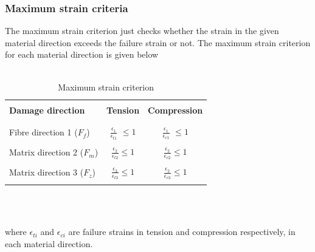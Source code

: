 \documentclass[a4paper,12pt]{article}
\begin{document}
\subsubsection{Maximum strain criteria}
\indent\indent\indent The maximum strain criterion just checks whether the strain in the given material direction exceeds the failure strain or not. The maximum strain criterion for each material direction is given below
\\
\\
\begin{table}[h!]
  \begin{center}
     \begin{tabular}{l  c  c} 
     \hline
     \\
      \textbf{Damage direction} \;\;& \textbf{Tension} \;& \textbf{Compression}\\
      \\
      \hline
      \\
      Fibre direction 1 ($F_{f}$) & \Large{$\frac{\epsilon_{1}}{\epsilon_{t1}} $}\small{ $\leq 1$} &  \Large{$\frac{\epsilon_{1}}{\epsilon_{c1}} $}\small{ $\leq 1$}\\
      \\
      Matrix direction 2 ($F_{m}$)  &  \Large{$\frac{\epsilon_{2}}{\epsilon_{t2}} $}\small{$\leq 1$}  & \Large{$\frac{\epsilon_{2}}{\epsilon_{c2}} $}\small{$\leq 1$}\\
      \\
      Matrix direction 3 ($F_{z}$) &  \Large{$\frac{\epsilon_{3}}{\epsilon_{t3}} $}\small{$\leq 1$}  &   \Large{$\frac{\epsilon_{2}}{\epsilon_{c3}} $}\small{$\leq 1$}\\
       \\
       \hline
    \end{tabular}
    \\
    \caption{Maximum strain criterion}
    \label{tab:Maximum strain criterion}
  \end{center}
\end{table}\\
where $\epsilon_{ti}$ and $\epsilon_{ci}$ are failure strains in tension and compression respectively, in each material direction. 
\\
\end{document}
